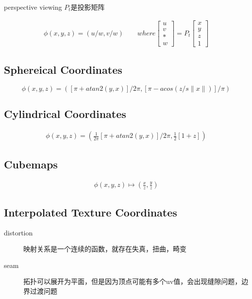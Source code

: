 perspective viewing $P_{t}$是投影矩阵

\begin{align*}
    \phi(x,y,z) = (u/w,v/w) \qquad where 
    \begin{bmatrix} u \\ v \\ * \\ w \end{bmatrix} = P_{t} 
    \begin{bmatrix} x \\ y \\ z \\ 1 \end{bmatrix}
\end{align*}


\subsection{Sphereical Coordinates}

\begin{equation}
    \phi(x,y,z) = ([\pi+atan2(y,x)]/2\pi,[\pi-acos(z/s\|x\|)]/\pi)
\end{equation}

\subsection{Cylindrical Coordinates}

\begin{align*}
    \phi(x,y,z) = (\frac{1}{2\pi}[\pi+atan2(y,x)]/2\pi,\frac{1}{2}[1+z])
\end{align*}

\subsection{Cubemaps}

\begin{align*}
    \phi(x,y,z) \mapsto (\frac{x}{z},\frac{y}{z})
\end{align*}

\subsection{Interpolated Texture Coordinates }

\begin{description}
    \item [distortion] \textsf{映射关系是一个连续的函数，就存在失真，扭曲，畸变}
    \item [seam] \textsf{拓扑可以展开为平面，但是因为顶点可能有多个uv值，会出现缝隙问题，边界过渡问题}
\end{description}

